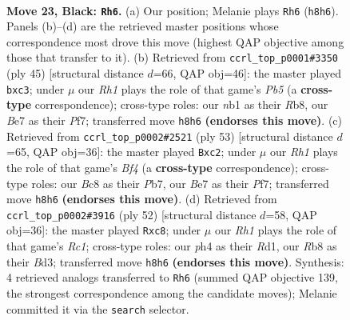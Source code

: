 \documentclass[11pt]{article}
\begin{document}
\clearpage

\begin{figure}[p]\centering
\begin{subfigure}{0.46\textwidth}\centering
\resizebox{\linewidth}{!}{%
\newchessgame
\chessboard[
  setfen={1rb1k2r/p1p1bp2/2p3p1/P1P4p/1P3P1P/8/1B5R/RN2K3 b Q - 2 23},
  showmover=false,
  pgfstyle=straightmove, color=movearrow, markmove={h8-h6}
]}
\caption{}
\end{subfigure}\hfill
\begin{subfigure}{0.46\textwidth}\centering
\resizebox{\linewidth}{!}{%
\newchessgame
\chessboard[
  setfen={1rbr2k1/4pp1p/2p3p1/2N1P3/1p1P3P/2P1K3/P4PP1/3R3R b - - 0 23},
  showmover=false,
  pgfstyle=straightmove, color=movearrow, markmove={b4-c3}
]}
\caption{}
\end{subfigure}
\\[4pt]
\begin{subfigure}{0.46\textwidth}\centering
\resizebox{\linewidth}{!}{%
\newchessgame
\chessboard[
  setfen={2r2k2/pp3pp1/3p3r/P2Ppb1p/8/2P1P3/1PB3PP/R1R3K1 b - - 2 27},
  showmover=false,
  pgfstyle=straightmove, color=movearrow, markmove={f5-c2}
]}
\caption{}
\end{subfigure}\hfill
\begin{subfigure}{0.46\textwidth}\centering
\resizebox{\linewidth}{!}{%
\newchessgame
\chessboard[
  setfen={2rr4/1p3p2/p2b1k2/6p1/1P1p2Pp/P2B1K1P/1P3P2/2RR4 w - - 0 27},
  showmover=false,
  pgfstyle=straightmove, color=movearrow, markmove={c1-c8}
]}
\caption{}
\end{subfigure}
\caption{\textbf{Move 23, Black: \texttt{Rh6}.} (a) Our position; Melanie plays \texttt{Rh6} (\texttt{h8h6}). Panels (b)--(d) are the retrieved master positions whose correspondence most drove this move (highest QAP objective among those that transfer to it). (b) Retrieved from \texttt{ccrl\_top\_p0001\#3350} (ply 45) [structural distance $d$=66, QAP obj=46]: the master played \texttt{bxc3}; under $\mu$ our \emph{Rh1} plays the role of that game's \emph{Pb5} (a \textbf{cross-type} correspondence); cross-type roles: our \emph{n}b1 as their \emph{R}b8, our \emph{B}e7 as their \emph{P}f7; transferred move \texttt{h8h6} \textbf{(endorses this move)}. (c) Retrieved from \texttt{ccrl\_top\_p0002\#2521} (ply 53) [structural distance $d$=65, QAP obj=36]: the master played \texttt{Bxc2}; under $\mu$ our \emph{Rh1} plays the role of that game's \emph{Bf4} (a \textbf{cross-type} correspondence); cross-type roles: our \emph{B}c8 as their \emph{P}b7, our \emph{B}e7 as their \emph{P}f7; transferred move \texttt{h8h6} \textbf{(endorses this move)}. (d) Retrieved from \texttt{ccrl\_top\_p0002\#3916} (ply 52) [structural distance $d$=58, QAP obj=36]: the master played \texttt{Rxc8}; under $\mu$ our \emph{Rh1} plays the role of that game's \emph{Rc1}; cross-type roles: our \emph{p}h4 as their \emph{R}d1, our \emph{R}b8 as their \emph{B}d3; transferred move \texttt{h8h6} \textbf{(endorses this move)}. Synthesis: 4 retrieved analogs transferred to \texttt{Rh6} (summed QAP objective 139, the strongest correspondence among the candidate moves); Melanie committed it via the \texttt{search} selector.}
\label{fig:thought-m45}
\end{figure}
\end{document}
